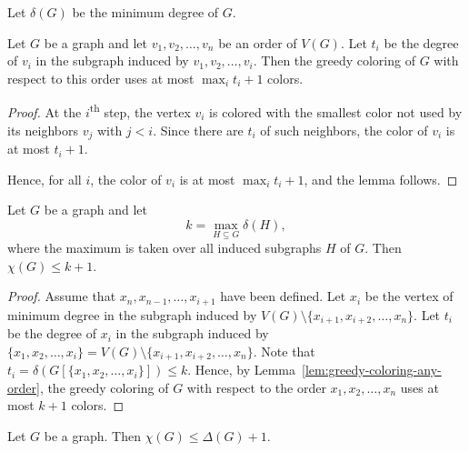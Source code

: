 Let \(\delta(G)\) be the minimum degree of \(G\).

\begin{lemma} \label{lem:greedy-coloring-any-order}
    Let \(G\) be a graph and let \(v_1, v_2, \ldots, v_n\) be an order of \(V(G)\).
    Let \(t_i\) be the degree of \(v_i\) in the subgraph induced by \(v_1, v_2, \ldots, v_i\).
    Then the greedy coloring of \(G\) with respect to this order uses at most \(\max_i t_i + 1\) colors.
\end{lemma}

\begin{proof}
    At the \(i\)\textsuperscript{th} step,
    the vertex \(v_i\) is colored with the smallest color not used by its neighbors \(v_j\) with \(j < i\).
    Since there are \(t_i\) of such neighbors,
    the color of \(v_i\) is at most \(t_i + 1\).

    Hence, for all \(i\),
    the color of \(v_i\) is at most \(\max_i t_i + 1\),
    and the lemma follows.
\end{proof}

\begin{theorem} \label{thm:greedy-coloring-induced-subgraph}
    Let \(G\) be a graph and let
    \begin{equation}
        k = \max_{H \subseteq G} \delta(H),
    \end{equation}
    where the maximum is taken over all induced subgraphs \(H\) of \(G\).
    Then \(\chi(G) \leq k + 1\).
\end{theorem}

\begin{proof}
    Assume that \(x_n, x_{n - 1}, \ldots, x_{i+1}\) have been defined.
    Let \(x_i\) be the vertex of minimum degree in the subgraph induced by \(V(G) \setminus \{x_{i + 1}, x_{i + 2}, \ldots, x_n\}\).
    Let \(t_i\) be the degree of \(x_i\) in the subgraph induced by \(\{x_1, x_2, \ldots, x_i\} = V(G) \setminus \{x_{i + 1}, x_{i + 2}, \ldots, x_n\}\).
    Note that \(t_i = \delta(G[\{x_1, x_2, \ldots, x_i\}]) \leq k\).
    Hence, by Lemma~\ref{lem:greedy-coloring-any-order},
    the greedy coloring of \(G\) with respect to the order \(x_1, x_2, \ldots, x_n\) uses at most \(k + 1\) colors.
\end{proof}

\begin{corollary} \label{cor:greedy-coloring-delta-plus-one}
    Let \(G\) be a graph.
    Then \(\chi(G) \leq \Delta(G) + 1\).
\end{corollary}

